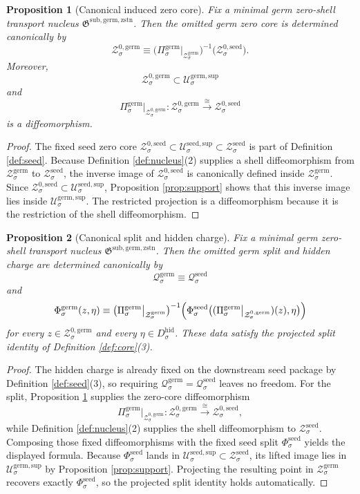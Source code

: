 \documentclass[11pt]{article}
\newcommand{\HiddenBody}[1]{D_{#1}^{\mathrm{hid}}}
\newcommand{\SeedShell}[1]{\mathcal Z_{#1}^{\mathrm{seed}}}
\newcommand{\SeedSupportShell}[1]{\mathcal U_{#1}^{\mathrm{seed,sup}}}
\newcommand{\SeedZeroCore}[1]{\mathcal Z_{#1}^{0,\mathrm{seed}}}
\newcommand{\SeedSplit}[1]{\Phi_{#1}^{\mathrm{seed}}}
\newcommand{\SeedCharge}[1]{\mathcal Q_{#1}^{\mathrm{seed}}}
\newcommand{\GermNucleus}{\mathfrak G^{\mathrm{sub,germ,zstn}}}
\newcommand{\GermProj}[1]{\Pi_{#1}^{\mathrm{germ}}}
\newcommand{\GermShell}[1]{\mathcal Z_{#1}^{\mathrm{germ}}}
\newcommand{\GermSupportShell}[1]{\mathcal U_{#1}^{\mathrm{germ,sup}}}
\newcommand{\GermZeroCore}[1]{\mathcal Z_{#1}^{0,\mathrm{germ}}}
\newcommand{\GermSplit}[1]{\Phi_{#1}^{\mathrm{germ}}}
\newcommand{\GermCharge}[1]{\mathcal Q_{#1}^{\mathrm{germ}}}
\newtheorem{proposition}{Proposition}
\begin{document}
\begin{proposition}[Canonical induced zero core]
\label{prop:zero}
Fix a minimal germ zero-shell transport nucleus \(\GermNucleus\). Then the omitted germ zero core is determined canonically by
\[
\GermZeroCore{\sigma}
\equiv
\bigl(\GermProj{\sigma}\big|_{\GermShell{\sigma}}\bigr)^{-1}
\bigl(\SeedZeroCore{\sigma}\bigr).
\]
Moreover,
\[
\GermZeroCore{\sigma}\subset\GermSupportShell{\sigma}
\]
and
\[
\GermProj{\sigma}\big|_{\GermZeroCore{\sigma}}
:
\GermZeroCore{\sigma}
\xrightarrow{\cong}
\SeedZeroCore{\sigma}
\]
is a diffeomorphism.
\end{proposition}

\begin{proof}
The fixed seed zero core \(\SeedZeroCore{\sigma}\subset\SeedSupportShell{\sigma}\subset\SeedShell{\sigma}\) is part of Definition \ref{def:seed}. Because Definition \ref{def:nucleus}(2) supplies a shell diffeomorphism from \(\GermShell{\sigma}\) to \(\SeedShell{\sigma}\), the inverse image of \(\SeedZeroCore{\sigma}\) is canonically defined inside \(\GermShell{\sigma}\). Since \(\SeedZeroCore{\sigma}\subset\SeedSupportShell{\sigma}\), Proposition \ref{prop:support} shows that this inverse image lies inside \(\GermSupportShell{\sigma}\). The restricted projection is a diffeomorphism because it is the restriction of the shell diffeomorphism.
\end{proof}

\begin{proposition}[Canonical split and hidden charge]
\label{prop:split}
Fix a minimal germ zero-shell transport nucleus \(\GermNucleus\). Then the omitted germ split and hidden charge are determined canonically by
\[
\GermCharge{\sigma}\equiv \SeedCharge{\sigma}
\]
and
\[
\GermSplit{\sigma}(z,\eta)
\equiv
\bigl(\GermProj{\sigma}\big|_{\GermShell{\sigma}}\bigr)^{-1}
\Bigl(
\SeedSplit{\sigma}\bigl(
(\GermProj{\sigma}\big|_{\GermZeroCore{\sigma}})(z),\eta
\bigr)
\Bigr)
\]
for every \(z\in\GermZeroCore{\sigma}\) and every \(\eta\in\HiddenBody{\sigma}\). These data satisfy the projected split identity of Definition \ref{def:core}(3).
\end{proposition}

\begin{proof}
The hidden charge is already fixed on the downstream seed package by Definition \ref{def:seed}(3), so requiring \(\GermCharge{\sigma}=\SeedCharge{\sigma}\) leaves no freedom. For the split, Proposition \ref{prop:zero} supplies the zero-core diffeomorphism
\[
\GermProj{\sigma}\big|_{\GermZeroCore{\sigma}}
:
\GermZeroCore{\sigma}
\xrightarrow{\cong}
\SeedZeroCore{\sigma},
\]
while Definition \ref{def:nucleus}(2) supplies the shell diffeomorphism to \(\SeedShell{\sigma}\). Composing those fixed diffeomorphisms with the fixed seed split \(\SeedSplit{\sigma}\) yields the displayed formula. Because \(\SeedSplit{\sigma}\) lands in \(\SeedSupportShell{\sigma}\subset\SeedShell{\sigma}\), its lifted image lies in \(\GermSupportShell{\sigma}\) by Proposition \ref{prop:support}. Projecting the resulting point in \(\GermShell{\sigma}\) recovers exactly \(\SeedSplit{\sigma}\), so the projected split identity holds automatically.
\end{proof}
\end{document}
